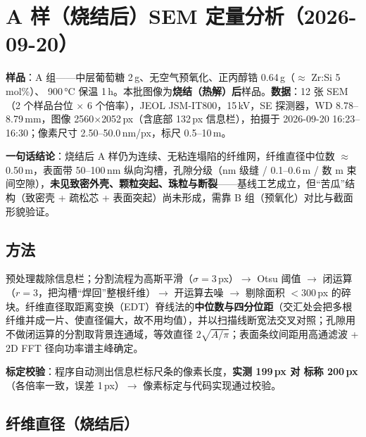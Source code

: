 
\section{A 样（烧结后）SEM 定量分析（2026-09-20）}
\label{sec:Asem}

\textbf{样品}：A 组——中层葡萄糖 2\,g、无空气预氧化、正丙醇锆 0.64\,g（$\approx$ Zr:Si 5 mol\%）、 900\,°C 保温 1\,h。本批图像为\textbf{烧结（热解）后}样品。\textbf{数据}：12 张 SEM（2 个样品台位 $\times$ 6 个倍率），JEOL JSM-IT800，15\,kV，SE 探测器，WD 8.78--8.79\,mm，图像 2560$\times$2052\,px（含底部 132\,px 信息栏），拍摄于 2026-09-20 16:23--16:30；像素尺寸 2.50--50.0\,nm/px，标尺 0.5--10\,\textmu m。

\textbf{一句话结论}：烧结后 A 样仍为连续、无粘连塌陷的纤维网，纤维直径中位数 $\approx$ 0.50\,\textmu m，表面带 50--100\,nm 纵向沟槽，孔隙分级（nm 级缝 / 0.1--0.6\,\textmu m / 数 \textmu m 束间空隙），\textbf{未见致密外壳、颗粒突起、珠粒与断裂}——基线工艺成立，但“苦瓜”结构（致密壳 + 疏松芯 + 表面突起）尚未形成，需靠 B 组（预氧化）对比与截面形貌验证。

\subsection{方法}

预处理裁除信息栏；分割流程为高斯平滑（$\sigma = 3$\,px）$\rightarrow$ Otsu 阈值 $\rightarrow$ 闭运算（$r = 3$，把沟槽“焊回”整根纤维）$\rightarrow$ 开运算去噪 $\rightarrow$ 剔除面积 $<$300\,px 的碎块。纤维直径取距离变换（EDT）脊线法的\textbf{中位数与四分位距}（交汇处会把多根纤维并成一片、使直径偏大，故不用均值），并以扫描线断宽法交叉对照；孔隙用不做闭运算的分割取背景连通域，等效直径 $2\sqrt{A/\pi}$；表面条纹间距用高通滤波 + 2D FFT 径向功率谱主峰确定。

\textbf{标定校验}：程序自动测出信息栏标尺条的像素长度，\textbf{实测 199\,px 对 标称 200\,px}（各倍率一致，误差 1\,px）$\rightarrow$ 像素标定与代码实现通过校验。

\subsection{纤维直径（烧结后）}

